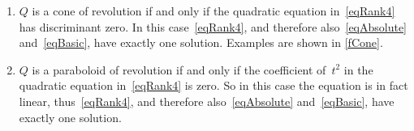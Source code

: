 \documentclass[reqno]{amsart}
\begin{document}
\begin{theorem}
\begin{enumerate}[label=(\alph*)]
    that $\ve x'$ is the other focus of $Q$, and $|t - t'|$ is equal
    to the distance between the two sheets of $Q$. An example is shown
    in \cref{fFive}.
  \item \label{tUniqueE} $Q$ is a cone of revolution if and only if
    the quadratic equation in~\eqref{eqRank4} has discriminant
    zero. In this case~\eqref{eqRank4}, and therefore
    also~\eqref{eqAbsolute} and~\eqref{eqBasic}, have exactly one
    solution. Examples are shown in \cref{fCone}.
  \item \label{tUniqueF} $Q$ is a paraboloid of revolution if and
    only if the coefficient of~$t^2$ in the quadratic equation
    in~\eqref{eqRank4} is zero. So in this case the equation is in
    fact linear, thus~\eqref{eqRank4}, and therefore
    also~\eqref{eqAbsolute} and~\eqref{eqBasic}, have exactly one
    solution.
  \end{enumerate}
\end{theorem}
\end{document}
